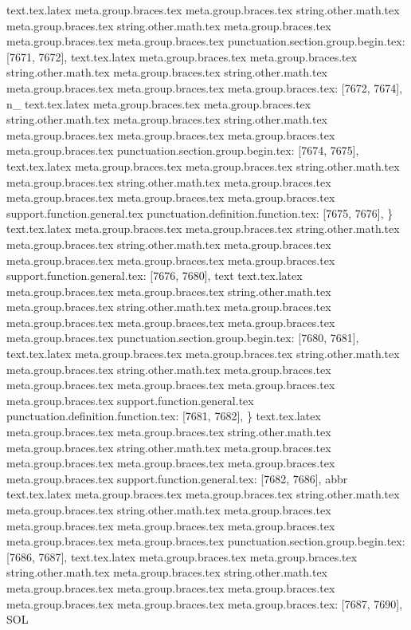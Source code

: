 {{{{{{{{{{{{{{{{{{{{{{{{{{{{{{{{{{{{{{{{{{{{{{{{{{{{{{{{{{{{{{{{{{{{{{{{{{{{{{{{{{{{{{{{{{{{{{{{{{{{{{{{{{{{{{{{{{{{{{{{{{{{{{{{{{{{{{{{{{{{{{{{{{{{{{{{{{{{{{{{{{{{{{{{{{{{{{{{{{{{{{{{{{{{{{{{{{{{{{{{{{{{{{{{{{{{{{{{{{text.tex.latex meta.group.braces.tex meta.group.braces.tex string.other.math.tex meta.group.braces.tex string.other.math.tex meta.group.braces.tex meta.group.braces.tex meta.group.braces.tex punctuation.section.group.begin.tex: [7671, 7672], {{}
text.tex.latex meta.group.braces.tex meta.group.braces.tex string.other.math.tex meta.group.braces.tex string.other.math.tex meta.group.braces.tex meta.group.braces.tex meta.group.braces.tex: [7672, 7674], {n_}
text.tex.latex meta.group.braces.tex meta.group.braces.tex string.other.math.tex meta.group.braces.tex string.other.math.tex meta.group.braces.tex meta.group.braces.tex meta.group.braces.tex meta.group.braces.tex punctuation.section.group.begin.tex: [7674, 7675], {{}
text.tex.latex meta.group.braces.tex meta.group.braces.tex string.other.math.tex meta.group.braces.tex string.other.math.tex meta.group.braces.tex meta.group.braces.tex meta.group.braces.tex meta.group.braces.tex support.function.general.tex punctuation.definition.function.tex: [7675, 7676], {\}
text.tex.latex meta.group.braces.tex meta.group.braces.tex string.other.math.tex meta.group.braces.tex string.other.math.tex meta.group.braces.tex meta.group.braces.tex meta.group.braces.tex meta.group.braces.tex support.function.general.tex: [7676, 7680], {text}
text.tex.latex meta.group.braces.tex meta.group.braces.tex string.other.math.tex meta.group.braces.tex string.other.math.tex meta.group.braces.tex meta.group.braces.tex meta.group.braces.tex meta.group.braces.tex meta.group.braces.tex punctuation.section.group.begin.tex: [7680, 7681], {{}
text.tex.latex meta.group.braces.tex meta.group.braces.tex string.other.math.tex meta.group.braces.tex string.other.math.tex meta.group.braces.tex meta.group.braces.tex meta.group.braces.tex meta.group.braces.tex meta.group.braces.tex support.function.general.tex punctuation.definition.function.tex: [7681, 7682], {\}
text.tex.latex meta.group.braces.tex meta.group.braces.tex string.other.math.tex meta.group.braces.tex string.other.math.tex meta.group.braces.tex meta.group.braces.tex meta.group.braces.tex meta.group.braces.tex meta.group.braces.tex support.function.general.tex: [7682, 7686], {abbr}
text.tex.latex meta.group.braces.tex meta.group.braces.tex string.other.math.tex meta.group.braces.tex string.other.math.tex meta.group.braces.tex meta.group.braces.tex meta.group.braces.tex meta.group.braces.tex meta.group.braces.tex meta.group.braces.tex punctuation.section.group.begin.tex: [7686, 7687], {{}
text.tex.latex meta.group.braces.tex meta.group.braces.tex string.other.math.tex meta.group.braces.tex string.other.math.tex meta.group.braces.tex meta.group.braces.tex meta.group.braces.tex meta.group.braces.tex meta.group.braces.tex meta.group.braces.tex: [7687, 7690], {SOL}
}}}}}}}}}}}}}}}}}}}}}}}}}}}}}}}}}}}}}}}}}}}}}}}}}}}}}}}}}}}}}}}}}}}}}}}}}}}}}}}}}}}}}}}}}}}}}}}}}}}}}}}}}}}}}}}}}}}}}}}}}}}}}}}}}}}}}}}}}}}}}}}}}}}}}}}}}}}}}}}}}}}}}}}}}}}}}}}}}}}}}}}}}}}}}}}}}}}}}}}}}}}}}}}}}}}}}}}}}}}}}}}}
